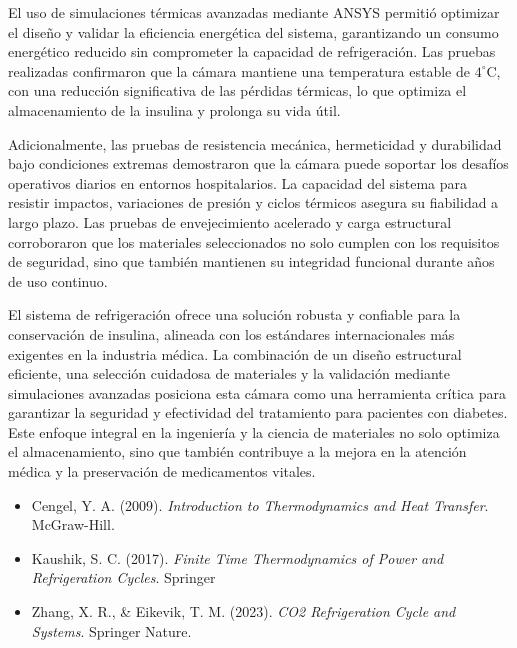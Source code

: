\documentclass[11pt,a4paper]{article}
\begin{document}
\begin{multicols}{2}
El uso de simulaciones térmicas avanzadas mediante ANSYS permitió optimizar el diseño y validar la eficiencia energética del sistema, garantizando un consumo energético reducido sin comprometer la capacidad de refrigeración. Las pruebas realizadas confirmaron que la cámara mantiene una temperatura estable de $4^\circ$C, con una reducción significativa de las pérdidas térmicas, lo que optimiza el almacenamiento de la insulina y prolonga su vida útil.

Adicionalmente, las pruebas de resistencia mecánica, hermeticidad y durabilidad bajo condiciones extremas demostraron que la cámara puede soportar los desafíos operativos diarios en entornos hospitalarios. La capacidad del sistema para resistir impactos, variaciones de presión y ciclos térmicos asegura su fiabilidad a largo plazo. Las pruebas de envejecimiento acelerado y carga estructural corroboraron que los materiales seleccionados no solo cumplen con los requisitos de seguridad, sino que también mantienen su integridad funcional durante años de uso continuo.

El sistema de refrigeración ofrece una solución robusta y confiable para la conservación de insulina, alineada con los estándares internacionales más exigentes en la industria médica. La combinación de un diseño estructural eficiente, una selección cuidadosa de materiales y la validación mediante simulaciones avanzadas posiciona esta cámara como una herramienta crítica para garantizar la seguridad y efectividad del tratamiento para pacientes con diabetes. Este enfoque integral en la ingeniería y la ciencia de materiales no solo optimiza el almacenamiento, sino que también contribuye a la mejora en la atención médica y la preservación de medicamentos vitales.


%
  


\begin{itemize}
	\setlength\itemindent{-1em} %
	\setlength{\leftskip}{1em}  %
	\item[] Cengel, Y. A. (2009). \textit{Introduction to Thermodynamics and Heat Transfer}. McGraw-Hill. 
	\item[] Kaushik, S. C. (2017). \textit{Finite Time Thermodynamics of Power and Refrigeration Cycles}. Springer
	\item[] Zhang, X. R., \& Eikevik, T. M. (2023). \textit{CO2 Refrigeration Cycle and Systems}. Springer Nature.  
	 
\end{itemize}

\end{multicols}
\end{document}
